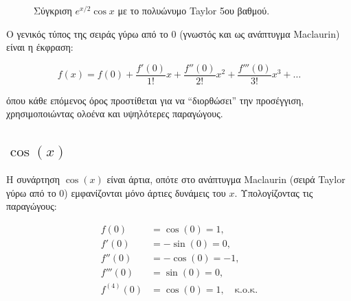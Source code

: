 \documentclass[a4paper, 11pt]{article}
\begin{document}
\begin{figure}[htbp]
\centering
{}
\caption{Σύγκριση $e^{x/2}\cos x$ με το πολυώνυμο Taylor 5ου βαθμού.}
\label{fig:expcostaylor}
\par
\end{figure}

Ο γενικός τύπος της σειράς γύρω από το \(0\) (γνωστός και ως ανάπτυγμα
Maclaurin) είναι η έκφραση:

\[f(x) = f(0) + \frac{f'(0)}{1!}x + \frac{f''(0)}{2!}x^2 + \frac{f'''(0)}{3!}x^3 + \dots\]

όπου κάθε επόμενος όρος προστίθεται για να ``διορθώσει'' την προσέγγιση,
χρησιμοποιώντας ολοένα και υψηλότερες παραγώγους.

\subsection{\texorpdfstring{\(\cos(x)\)}{\textbackslash cos(x)}}\label{cosx}

Η συνάρτηση \(\cos(x)\) είναι άρτια, οπότε στο ανάπτυγμα Maclaurin
(σειρά Taylor γύρω από το \(0\)) εμφανίζονται μόνο άρτιες δυνάμεις του
\(x\). Υπολογίζοντας τις παραγώγους:

\[
\begin{aligned}
f(0) &= \cos(0) = 1, \\
f'(0) &= -\sin(0) = 0, \\
f''(0) &= -\cos(0) = -1, \\
f'''(0) &= \sin(0) = 0, \\
f^{(4)}(0) &= \cos(0) = 1, \quad \text{κ.ο.κ.}
\end{aligned}
\]
\end{document}
